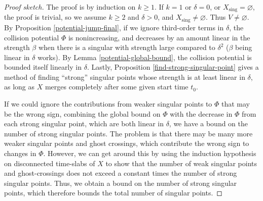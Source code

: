 \documentclass[11pt,reqno,twoside]{amsart}
\newcommand{\sing}{\mathrm{sing}}
\theoremstyle{definition}
\begin{document}
\begin{proof}[Proof sketch] The proof is by induction on $k \geq 1$. If $k=1$ or $\delta = 0$, or $X_\sing = \varnothing$, the proof is trivial, so we assume $k \geq 2$ and $\delta > 0$, and $X_\sing \neq \varnothing$. Thus $V \neq \varnothing$. By Proposition \ref{potential-jump-final}, if we ignore third-order terms in $\delta$, the collision potential $\Phi$ is nonincreasing, and decreases by an amount linear in the strength $\beta$ when there is a singular with strength large compared to  $\delta^2$ ($\beta$ being linear in $\delta$ works). By Lemma \ref{potential-global-bound}, the collision potential is bounded itself linearly in $\delta$. Lastly, Proposition \ref{find-strong-singular-point} gives a method of finding ``strong'' singular points whose strength is at least linear in $\delta$, as long as $X$ merges completely after some given start time $t_0$. 

If we could ignore the contributions from weaker singular points to $\Phi$ that may be the wrong sign, combining the global bound on $\Phi$ with the decrease in $\Phi$ from each strong singular point, which are both linear in $\delta$, we have a bound on the number of strong singular points. The problem is that there may be many more weaker singular points and ghost crossings, which contribute the wrong sign to changes in $\Phi$. However, we can get around this by using the induction hypothesis on disconnected time-slabs of $X$ to show that the number of weak singular points and ghost-crossings does not exceed a constant times the number of strong singular points. Thus, we obtain a bound on the number of strong singular points, which therefore bounds the total number of singular points.

\end{proof}
\end{document}
